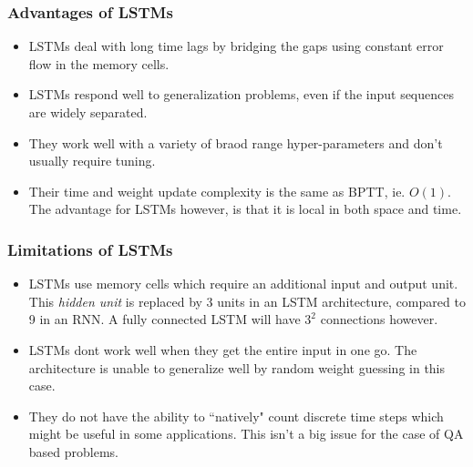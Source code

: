 \documentclass[12pt]{report}
\begin{document}
            \subsubsection{Advantages of LSTMs}
                \begin{itemize}
                    \item LSTMs deal with long time lags by bridging the gaps using constant error flow in the memory cells.
                    \item LSTMs respond well to generalization problems, even if the input sequences are widely separated.
                    \item They work well with a variety of braod range hyper-parameters and don't usually require tuning.
                    \item Their time and weight update complexity is the same as BPTT, ie. $ O(1) $. The advantage for LSTMs however, is that it is local in both space and time.
                \end{itemize}

            \subsubsection{Limitations of LSTMs}
                \begin{itemize}
                    \item LSTMs use memory cells which require an additional input and output unit. This \textit{hidden unit} is replaced by 3 units in an LSTM architecture, compared to 9 in an RNN. A fully connected LSTM will have $ 3^{2} $ connections however.
                    \item LSTMs dont work well when they get the entire input in one go. The architecture is unable to generalize well by random weight guessing in this case.
                    \item They do not have the ability to ``natively" count discrete time steps which might be useful in some applications. This isn't a big issue for the case of QA based problems.
                \end{itemize}
\end{document}
